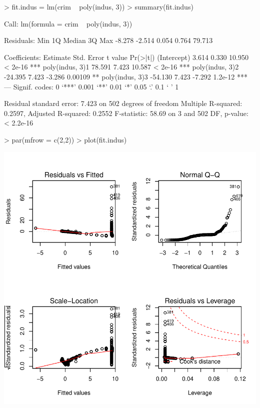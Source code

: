\documentclass[a4paper]{article}
\begin{document}
\begin{Schunk}
\begin{Sinput}
> fit.indus = lm(crim ~ poly(indus, 3))
> summary(fit.indus)
\end{Sinput}
\begin{Soutput}
Call:
lm(formula = crim ~ poly(indus, 3))

Residuals:
   Min     1Q Median     3Q    Max 
-8.278 -2.514  0.054  0.764 79.713 

Coefficients:
                Estimate Std. Error t value Pr(>|t|)    
(Intercept)        3.614      0.330  10.950  < 2e-16 ***
poly(indus, 3)1   78.591      7.423  10.587  < 2e-16 ***
poly(indus, 3)2  -24.395      7.423  -3.286  0.00109 ** 
poly(indus, 3)3  -54.130      7.423  -7.292  1.2e-12 ***
---
Signif. codes:  0 ‘***’ 0.001 ‘**’ 0.01 ‘*’ 0.05 ‘.’ 0.1 ‘ ’ 1

Residual standard error: 7.423 on 502 degrees of freedom
Multiple R-squared:  0.2597,	Adjusted R-squared:  0.2552 
F-statistic: 58.69 on 3 and 502 DF,  p-value: < 2.2e-16
\end{Soutput}
\begin{Sinput}
> par(mfrow = c(2,2))
> plot(fit.indus)
\end{Sinput}
\end{Schunk}
\includegraphics{mutivariblelm-indus2}
\end{document}
